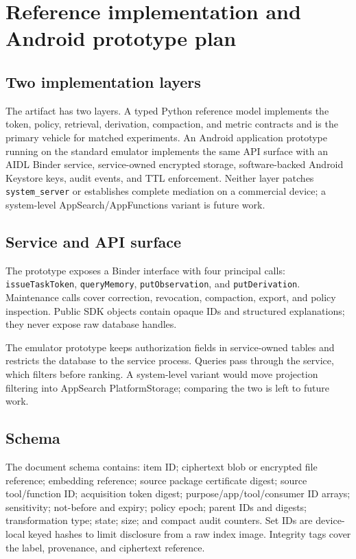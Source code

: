 \section{Reference implementation and Android prototype plan}
\label{sec:implementation}

\subsection{Two implementation layers}

The artifact has two layers. A typed Python reference model implements the token, policy, retrieval, derivation, compaction, and metric contracts and is the primary vehicle for matched experiments. An Android application prototype running on the standard emulator implements the same API surface with an AIDL Binder service, service-owned encrypted storage, software-backed Android Keystore keys, audit events, and TTL enforcement. Neither layer patches \texttt{system\_server} or establishes complete mediation on a commercial device; a system-level AppSearch/AppFunctions variant is future work.

\subsection{Service and API surface}

The prototype exposes a Binder interface with four principal calls: \texttt{issueTaskToken}, \texttt{queryMemory}, \texttt{putObservation}, and \texttt{putDerivation}. Maintenance calls cover correction, revocation, compaction, export, and policy inspection. Public SDK objects contain opaque IDs and structured explanations; they never expose raw database handles.

The emulator prototype keeps authorization fields in service-owned tables and restricts the database to the service process. Queries pass through the service, which filters before ranking. A system-level variant would move projection filtering into AppSearch PlatformStorage; comparing the two is left to future work.

\subsection{Schema}

The document schema contains: item ID; ciphertext blob or encrypted file reference; embedding reference; source package certificate digest; source tool/function ID; acquisition token digest; purpose/app/tool/consumer ID arrays; sensitivity; not-before and expiry; policy epoch; parent IDs and digests; transformation type; state; size; and compact audit counters. Set IDs are device-local keyed hashes to limit disclosure from a raw index image. Integrity tags cover the label, provenance, and ciphertext reference.

